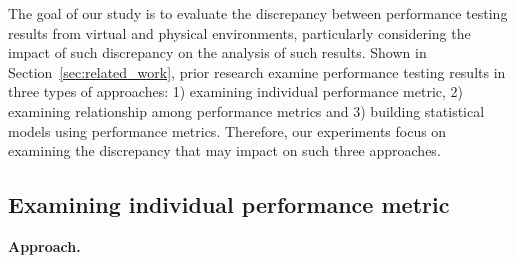 The goal of our study is to evaluate the discrepancy between performance testing results from virtual and physical environments, particularly considering the impact of such discrepancy on the analysis of such results. Shown in Section~\ref{sec:related_work}, prior research examine performance testing results in three types of approaches: 1) examining individual performance metric, 2) examining relationship among performance metrics and 3) building statistical models using performance metrics. Therefore, our experiments focus on examining the discrepancy that may impact on such three approaches.



\subsection{Examining individual performance metric}
\label{sec:individual}
\noindent \textbf{Approach.} 

